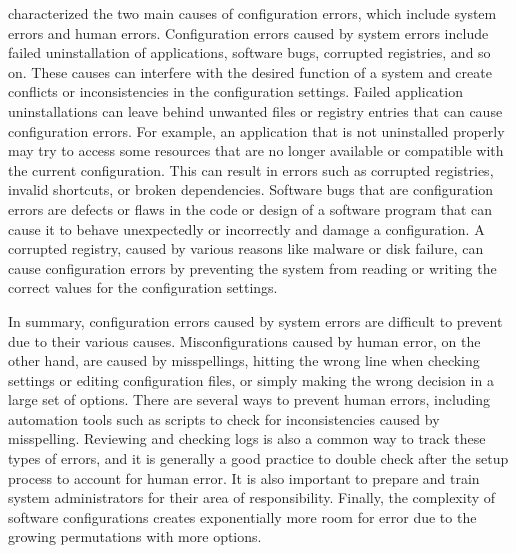 \documentclass[english,bachelor]{swsLeipzig}
\begin{document}
\citet{xuzhou:2015} characterized the two main causes of configuration errors, which include system errors and 
human errors. Configuration errors caused by system errors include failed uninstallation of applications, software 
bugs, corrupted registries, and so on. These causes can interfere with the desired function of a system and create 
conflicts or inconsistencies in the configuration settings. Failed application uninstallations can leave behind 
unwanted files or registry entries that can cause configuration errors. For example, an application that is not 
uninstalled properly may try to access some resources that are no longer available or compatible with the current 
configuration. This can result in errors such as corrupted registries, invalid shortcuts, or broken dependencies. 
Software bugs that are configuration errors are defects or flaws in the code or design of a software program that 
can cause it to behave unexpectedly or incorrectly and damage a configuration. A corrupted registry, caused by 
various reasons like malware or disk failure, can cause configuration errors by preventing the system from reading 
or writing the correct values for the configuration settings.

In summary, configuration errors caused by system 
errors are difficult to prevent due to their various causes. Misconfigurations caused by human error, on the other 
hand, are caused by misspellings, hitting the wrong line when checking settings or editing configuration files, 
or simply making the wrong decision in a large set of options. There are several ways to prevent human errors, 
including automation tools such as scripts to check for inconsistencies caused by misspelling. Reviewing and checking 
logs is also a common way to track these types of errors, and it is generally a good practice to double check after 
the setup process to account for human error. It is also important to prepare and train system administrators for 
their area of responsibility. Finally, the complexity of software configurations creates exponentially more room 
for error due to the growing permutations with more options.
\end{document}
